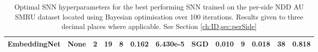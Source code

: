 \begin{table}[!ht]
{\begin{tabular}{ccccccccccccc}
			EmbeddingNet                                                       & None                                                                        & 2                                                                 & 19                                                                                     & 8                                                                                             & 0.162            & 6.430e-5                                                          & SGD               & 0.010                                                                            & 9                                                                                & 0.018             & 38                                                               & 0.818                                                                              \\
			\bottomrule                                                      
	\end{tabular}}
	\caption{Optimal SNN hyperparameters for the best performing SNN trained on the per-side NDD AU SMRU dataset located using Bayesian optimisation over 100 iterations. Results given to three decimal places where applicable. See Section \ref{ch:ID,sec:perSide}}
\end{table}

